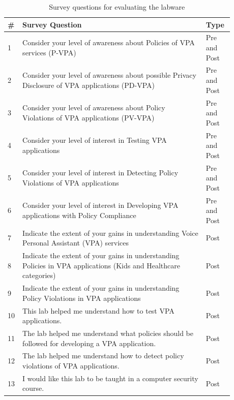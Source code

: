 \documentclass{article}
\begin{document}
\begin{table}[h]
\caption{Survey questions for evaluating the labware}
\label{Survey Question Table}
\centering
\footnotesize%
\begin{tabular}{|p{0.03\linewidth} | p{0.75\linewidth} | p{0.10\linewidth} |}
\hline
\# & Survey Question                                                                             & Type         \\ \hline
1  & Consider your level of awareness about Policies of VPA services (P-VPA)                     & Pre and Post \\ \hline
2  & Consider your level of awareness about possible Privacy Disclosure of VPA applications (PD-VPA)                  & Pre and Post \\ \hline
3  & Consider your level of awareness about Policy Violations of VPA applications (PV-VPA)           & Pre and Post \\ \hline
4  & Consider your level of interest in Testing VPA applications                                     & Pre and Post \\ \hline
5  & Consider your level of interest in Detecting Policy Violations of VPA applications               & Pre and Post \\ \hline
6  & Consider your level of interest in Developing VPA applications with Policy Compliance           & Pre and Post \\ \hline
7 & Indicate the extent of your gains in understanding Voice Personal Assistant (VPA) services  & Post         \\ \hline
8 & Indicate the extent of your gains in understanding Policies in VPA applications (Kids and Healthcare categories) & Post         \\ \hline
9 & Indicate the extent of your gains in understanding Policy Violations in VPA applications        & Post         \\ \hline
10 & This lab helped me understand how to test VPA applications.                                     & Post         \\ \hline
11 & The lab helped me understand what policies should be followed for developing a VPA application. & Post         \\ \hline
12 & The lab helped me understand how to detect policy violations of VPA applications.               & Post         \\ \hline
13 & I would like this lab to be taught in a computer security course.                           & Post         \\ \hline
\end{tabular}
\end{table}
\end{document}
